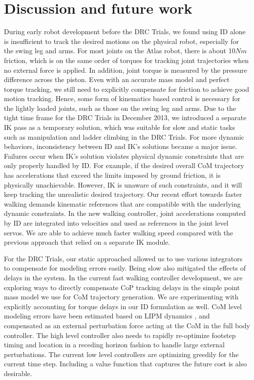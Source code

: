 \documentclass{ws-ijhr}
\begin{document}
\section{Discussion and future work}
\label{sec:dis}
During early robot development before the DRC Trials, we found using ID alone is 
insufficient to track the desired motions on the physical robot, especially 
for the swing leg and arms. 
For most joints on the Atlas robot, there is about 10$Nm$ friction, which is
on the same order of torques for tracking joint trajectories when no external
force is applied.
In addition, joint torque is measured by the pressure difference across the
piston. 
Even with an accurate mass model and perfect torque tracking, we still
need to explicitly compensate for friction to achieve good motion tracking.
Hence, some form of kinematics based control is necessary for the lightly loaded
joints, such as those on the swing leg and arms.
Due to the tight time frame for the DRC Trials in December 2013, we introduced
a separate IK pass as a temporary solution, which was suitable for slow and
static tasks such as manipulation and ladder climbing in the DRC Trials. 
For more dynamic behaviors, inconsistency between ID and IK's solutions became 
a major issue. 
Failures occur when IK's solution violates physical dynamic constraints that are 
only properly handled by ID. 
For example, if the desired overall CoM trajectory has accelerations that 
exceed the limits imposed by ground friction, it is physically unachievable. 
However, IK is unaware of such constraints, and it will keep tracking the 
unrealistic desired trajectory. 
Our recent effort towards faster walking demands kinematic references that are 
compatible with the underlying dynamic constraints. 
In the new walking controller, joint accelerations computed by ID are 
integrated into velocities and used as references in the joint level servos. 
We are able to achieve much faster walking speed compared with the previous 
approach that relied on a separate IK module. 

For the DRC Trials, our static approached allowed us to use various integrators to 
compensate for modeling errors easily. 
Being slow also mitigated the effects of delays in the system. 
In the current fast walking controller development, we are exploring ways to 
directly compensate CoP tracking delays in the simple point mass model we use 
for CoM trajectory generation. 
We are experimenting with explicitly accounting for torque delays in our ID
formulation as well.  
CoM level modeling errors have been estimated based on LIPM 
dynamics \cite{benx_proposal}, and compensated as an external perturbation 
force acting at the CoM \cite{sfeng_proposal} in the full body controller.
The high level controller also needs to rapidly re-optimize footstep timing and
location in a receding horizon fashion to handle large external perturbations. 
The current low level controllers are optimizing greedily for the current 
time step. 
Including a value function \cite{scott_qp} that captures the future cost is 
also desirable. 
\end{document}

